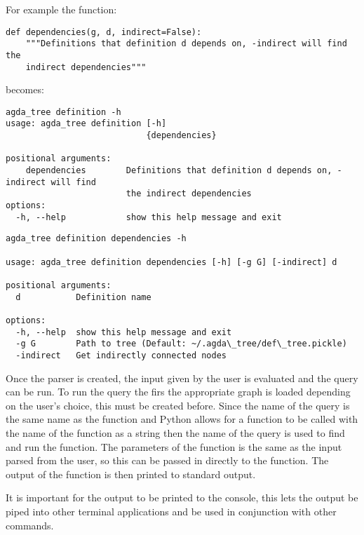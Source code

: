 For example the function:

\begin{lstlisting}
def dependencies(g, d, indirect=False):
    """Definitions that definition d depends on, -indirect will find the
    indirect dependencies"""
\end{lstlisting}

becomes:

\begin{lstlisting}
agda_tree definition -h
usage: agda_tree definition [-h]
                            {dependencies}

positional arguments:
    dependencies        Definitions that definition d depends on, -indirect will find
                        the indirect dependencies
options:
  -h, --help            show this help message and exit
\end{lstlisting}

\begin{lstlisting}
agda_tree definition dependencies -h

usage: agda_tree definition dependencies [-h] [-g G] [-indirect] d

positional arguments:
  d           Definition name

options:
  -h, --help  show this help message and exit
  -g G        Path to tree (Default: ~/.agda\_tree/def\_tree.pickle)
  -indirect   Get indirectly connected nodes
\end{lstlisting}

Once the parser is created, the input given by the user is evaluated and the
query can be run. To run the query the firs the appropriate graph is loaded
depending on the user's choice, this must be created before. Since the name of
the query is the same name as the function and Python allows for a function to
be called with the name of the function as a string then the name of the query
is used to find and run the function. The parameters of the function is the
same as the input parsed from the user, so this can be passed in directly to
the function. The output of the function is then printed to standard output.

It is important for the output to be printed to the console, this lets the
output be piped into other terminal applications and be used in conjunction
with other commands.


